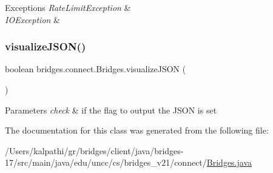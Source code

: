 \begin{DoxyExceptions}{Exceptions}
{\em Rate\+Limit\+Exception} & \\
\hline
{\em I\+O\+Exception} & \\
\hline
\end{DoxyExceptions}
\mbox{\label{classbridges_1_1connect_1_1_bridges_afd3c63780396e92c94c923037385b31d}} 
\subsubsection{\texorpdfstring{visualize\+J\+S\+O\+N()}{visualizeJSON()}}
{\footnotesize\ttfamily boolean bridges.\+connect.\+Bridges.\+visualize\+J\+S\+ON (\begin{DoxyParamCaption}{ }\end{DoxyParamCaption})}


\begin{DoxyParams}{Parameters}
{\em check} & if the flag to output the J\+S\+ON is set \\
\hline
\end{DoxyParams}


The documentation for this class was generated from the following file\+:\begin{DoxyCompactItemize}
\item 
/\+Users/kalpathi/gr/bridges/client/java/bridges-\/17/src/main/java/edu/uncc/cs/bridges\+\_\+v21/connect/\mbox{\hyperlink{_bridges_8java}{Bridges.\+java}}\end{DoxyCompactItemize}
